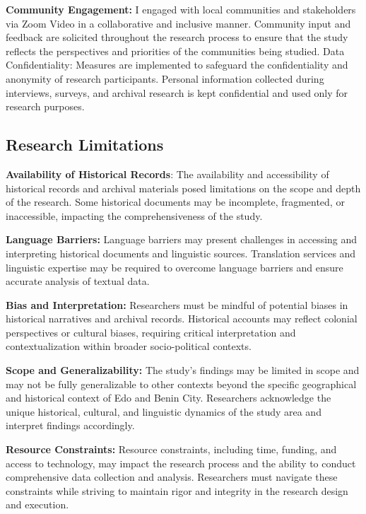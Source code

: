 \textbf{Community Engagement:} I engaged with local communities and stakeholders via Zoom Video in a collaborative and inclusive manner. Community input and feedback are solicited throughout the research process to ensure that the study reflects the perspectives and priorities of the communities being studied.
Data Confidentiality: Measures are implemented to safeguard the confidentiality and anonymity of research participants. Personal information collected during interviews, surveys, and archival research is kept confidential and used only for research purposes.
\subsection*{Research Limitations}
\textbf{Availability of Historical Records}: The availability and accessibility of historical records and archival materials posed limitations on the scope and depth of the research. Some historical documents may be incomplete, fragmented, or inaccessible, impacting the comprehensiveness of the study.


\textbf{Language Barriers:} Language barriers may present challenges in accessing and interpreting historical documents and linguistic sources. Translation services and linguistic expertise may be required to overcome language barriers and ensure accurate analysis of textual data.

\textbf{Bias and Interpretation:} Researchers must be mindful of potential biases in historical narratives and archival records. Historical accounts may reflect colonial perspectives or cultural biases, requiring critical interpretation and contextualization within broader socio-political contexts.

\textbf{Scope and Generalizability:} The study's findings may be limited in scope and may not be fully generalizable to other contexts beyond the specific geographical and historical context of Edo and Benin City. Researchers acknowledge the unique historical, cultural, and linguistic dynamics of the study area and interpret findings accordingly.

\textbf{Resource Constraints:} Resource constraints, including time, funding, and access to technology, may impact the research process and the ability to conduct comprehensive data collection and analysis. Researchers must navigate these constraints while striving to maintain rigor and integrity in the research design and execution.
